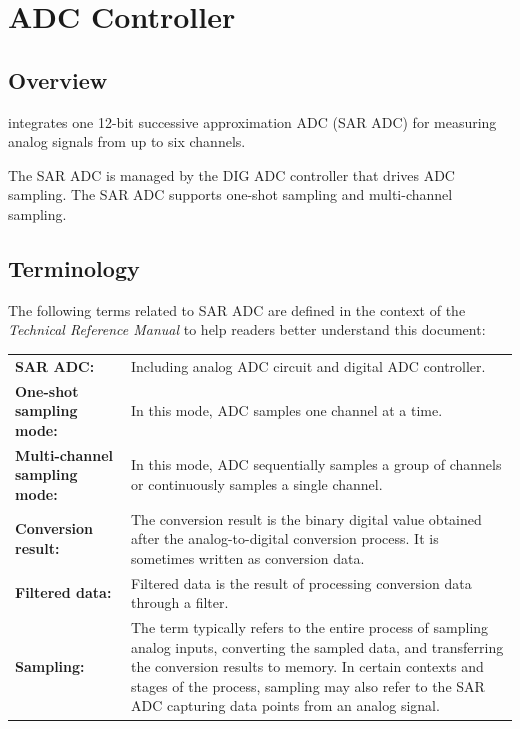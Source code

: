 \documentclass[main\_\_EN.tex]{subfiles}
\begin{document}

\ifglobal
\else
    \listoftodos
    {\let\clearpage\relax \listofdonetodos}
    \tableofcontents
\fi



\hypertarget{adc}{}
\chapter{ADC Controller}
\label{mod:adc}



\section{Overview}

\chipname{} integrates one 12-bit successive approximation ADC (SAR ADC) for measuring analog signals from up to six channels.

The SAR ADC is managed by the DIG ADC controller that drives ADC sampling. The SAR ADC supports one-shot sampling and multi-channel sampling.


\section{Terminology}

The following terms related to SAR ADC are defined in the context of the \textit{\chipname{} Technical Reference Manual} to help readers better understand this document:

\begin{longtable}{ R{6cm} p{10cm} }
\textbf{SAR ADC:} & Including analog ADC circuit and digital ADC controller. \\
\textbf{One-shot sampling mode:} & In this mode, ADC samples one channel at a time. \\
\textbf{Multi-channel sampling mode:} & In this mode, ADC sequentially samples a group of channels or continuously samples a single channel.  \\
\textbf{Conversion result:} & The conversion result is the binary digital value obtained after the analog-to-digital conversion process. It is sometimes written as conversion data.\\
\textbf{Filtered data:} & Filtered data is the result of processing conversion data through a filter.\\
\textbf{Sampling:} & The term typically refers to the entire process of sampling analog inputs, converting the sampled data, and transferring the conversion results to memory. In certain contexts and stages of the process, sampling may also refer to the SAR ADC capturing data points from an analog signal.\\
\end{longtable}
\end{document}
